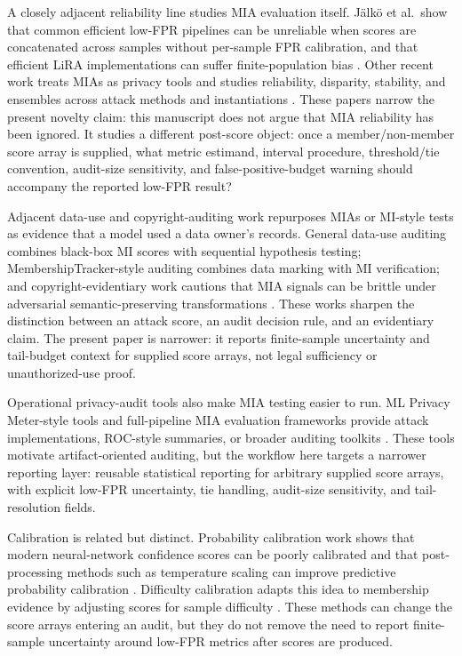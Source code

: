 \documentclass[
  10pt,
  twocolumn]{article}
\begin{document}
A closely adjacent reliability line studies MIA evaluation itself. Jälkö et al.~show that common efficient low-FPR pipelines can be unreliable when scores are concatenated across samples without per-sample FPR calibration, and that efficient LiRA implementations can suffer finite-population bias \cite{ref-12}. Other recent work treats MIAs as privacy tools and studies reliability, disparity, stability, and ensembles across attack methods and instantiations \cite{ref-15}. These papers narrow the present novelty claim: this manuscript does not argue that MIA reliability has been ignored. It studies a different post-score object: once a member/non-member score array is supplied, what metric estimand, interval procedure, threshold/tie convention, audit-size sensitivity, and false-positive-budget warning should accompany the reported low-FPR result?

Adjacent data-use and copyright-auditing work repurposes MIAs or MI-style tests as evidence that a model used a data owner's records. General data-use auditing combines black-box MI scores with sequential hypothesis testing; MembershipTracker-style auditing combines data marking with MI verification; and copyright-evidentiary work cautions that MIA signals can be brittle under adversarial semantic-preserving transformations \cite{ref-20,ref-21,ref-22,ref-35}. These works sharpen the distinction between an attack score, an audit decision rule, and an evidentiary claim. The present paper is narrower: it reports finite-sample uncertainty and tail-budget context for supplied score arrays, not legal sufficiency or unauthorized-use proof.

Operational privacy-audit tools also make MIA testing easier to run. ML Privacy Meter-style tools and full-pipeline MIA evaluation frameworks provide attack implementations, ROC-style summaries, or broader auditing toolkits \cite{ref-17,ref-18}. These tools motivate artifact-oriented auditing, but the workflow here targets a narrower reporting layer: reusable statistical reporting for arbitrary supplied score arrays, with explicit low-FPR uncertainty, tie handling, audit-size sensitivity, and tail-resolution fields.

Calibration is related but distinct. Probability calibration work shows that modern neural-network confidence scores can be poorly calibrated and that post-processing methods such as temperature scaling can improve predictive probability calibration \cite{ref-11}. Difficulty calibration adapts this idea to membership evidence by adjusting scores for sample difficulty \cite{ref-4}. These methods can change the score arrays entering an audit, but they do not remove the need to report finite-sample uncertainty around low-FPR metrics after scores are produced.
\end{document}
